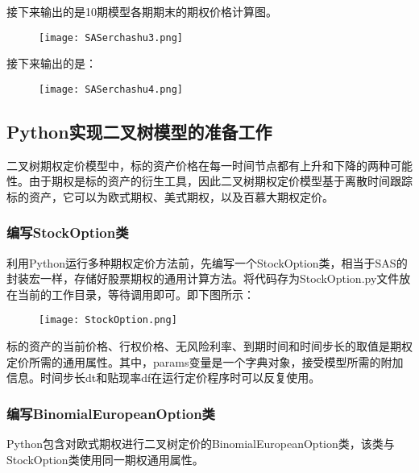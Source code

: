 	接下来输出的是10期模型各期期末的期权价格计算图。
	
	\begin{figure}[htb] %
		\centering
		\texttt{[image: SASerchashu3.png]}
		\label{fig:xfig1}
	\end{figure}
	
	接下来输出的是：
	
	\begin{figure}[htb] %
		\centering
		\texttt{[image: SASerchashu4.png]}
		\label{fig:xfig1}
	\end{figure}
	
\clearpage	

\subsection{Python实现二叉树模型的准备工作}
	二叉树期权定价模型中，标的资产价格在每一时间节点都有上升和下降的两种可能性。由于期权是标的资产的衍生工具，因此二叉树期权定价模型基于离散时间跟踪标的资产，它可以为欧式期权、美式期权，以及百慕大期权定价。
	
\subsubsection{编写StockOption类}
	利用Python运行多种期权定价方法前，先编写一个StockOption类，相当于SAS的封装宏一样，存储好股票期权的通用计算方法。将代码存为StockOption.py文件放在当前的工作目录，等待调用即可。即下图所示：
	
	\begin{figure}[htb] %
		\centering
		\texttt{[image: StockOption.png]}
		\label{fig:xfig1}
	\end{figure}

	标的资产的当前价格、行权价格、无风险利率、到期时间和时间步长的取值是期权定价所需的通用属性。其中，params变量是一个字典对象，接受模型所需的附加信息。时间步长dt和贴现率df在运行定价程序时可以反复使用。
	
\subsubsection{编写BinomialEuropeanOption类}
	Python包含对欧式期权进行二叉树定价的BinomialEuropeanOption类，该类与StockOption类使用同一期权通用属性。
	
